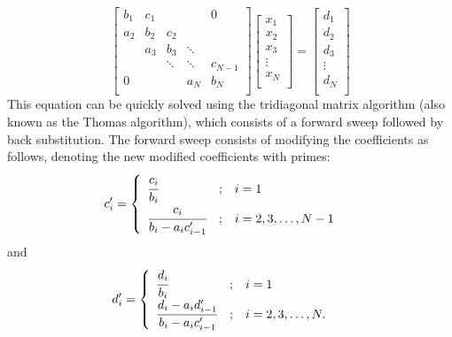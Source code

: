 \documentclass[twocolumn,10pt]{asme2ej}
\begin{document}
\begin{equation}
\begin{bmatrix}
   {b_1} & {c_1} & {   } & {   } & { 0 } \\
   {a_2} & {b_2} & {c_2} & {   } & {   } \\
   {   } & {a_3} & {b_3} & \ddots & {   } \\
   {   } & {   } & \ddots & \ddots & {c_{N-1}}\\
   { 0 } & {   } & {   } & {a_N} & {b_N}\\
\end{bmatrix}
\begin{bmatrix}
   {x_1 }  \\
   {x_2 }  \\
   {x_3 }  \\
   \vdots   \\
   {x_N }  \\
\end{bmatrix}
=
\begin{bmatrix}
   {d_1 }  \\
   {d_2 }  \\
   {d_3 }  \\
   \vdots   \\
   {d_N }  \\
\end{bmatrix}
\end{equation}
This equation can be quickly solved using the tridiagonal matrix algorithm (also known as the Thomas algorithm), which consists of a forward sweep followed by back substitution. The forward sweep consists of modifying the coefficients as follows, denoting the new modified coefficients with primes:
\begin{equation}
c'_i =
\begin{cases}
\begin{array}{lcl}
  \cfrac{c_i}{b_i}                  & ; & i = 1 \\
  \cfrac{c_i}{b_i - a_i c'_{i - 1}} & ; & i = 2, 3, \dots, N-1 \\
\end{array}
\end{cases}
\,\end{equation}
and
\begin{equation}
d'_i =
\begin{cases}
\begin{array}{lcl}
  \cfrac{d_i}{b_i}                  & ; & i = 1 \\
  \cfrac{d_i - a_i d'_{i - 1}}{b_i - a_i c'_{i - 1}} & ; & i = 2, 3, \dots, N. \\
\end{array}
\end{cases}
\,\end{equation}
\end{document}
